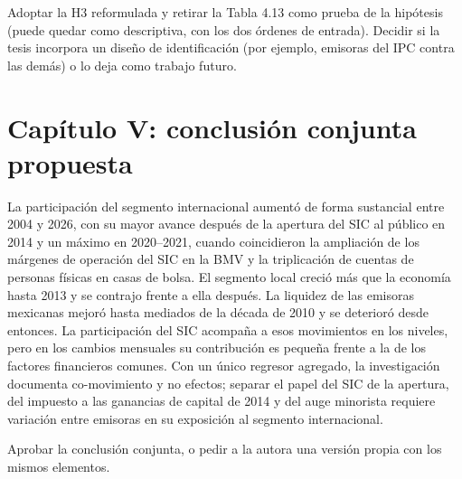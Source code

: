 \documentclass[11pt,letterpaper]{article}
\begin{document}
\begin{decision}Adoptar la H3 reformulada y retirar la Tabla 4.13 como prueba de la hipótesis (puede quedar como descriptiva, con los dos órdenes de entrada). Decidir si la tesis incorpora un diseño de identificación (por ejemplo, emisoras del IPC contra las demás) o lo deja como trabajo futuro.\end{decision}

\section{Capítulo V: conclusión conjunta propuesta}
\begin{texto}
La participación del segmento internacional aumentó de forma sustancial entre 2004 y 2026, con su mayor avance después de la apertura del SIC al público en 2014 y un máximo en 2020--2021, cuando coincidieron la ampliación de los márgenes de operación del SIC en la BMV y la triplicación de cuentas de personas físicas en casas de bolsa. El segmento local creció más que la economía hasta 2013 y se contrajo frente a ella después. La liquidez de las emisoras mexicanas mejoró hasta mediados de la década de 2010 y se deterioró desde entonces. La participación del SIC acompaña a esos movimientos en los niveles, pero en los cambios mensuales su contribución es pequeña frente a la de los factores financieros comunes. Con un único regresor agregado, la investigación documenta co-movimiento y no efectos; separar el papel del SIC de la apertura, del impuesto a las ganancias de capital de 2014 y del auge minorista requiere variación entre emisoras en su exposición al segmento internacional.
\end{texto}

\begin{decision}Aprobar la conclusión conjunta, o pedir a la autora una versión propia con los mismos elementos.\end{decision}
\end{document}
